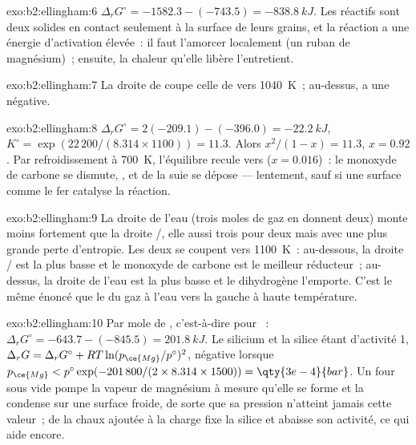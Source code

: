 \begin{solution}{exo:b2:ellingham:6}
$\Delta_r G^\circ = -1582.3 - (-743.5) = \qty{-838.8}{kJ}$. Les réactifs sont
deux solides en contact seulement à la surface de leurs grains, et la réaction
a une énergie d'activation élevée~: il faut l'amorcer localement (un ruban de magnésium)~;
ensuite, la chaleur qu'elle libère l'entretient.
\end{solution}

\begin{solution}{exo:b2:ellingham:7}
La droite de  coupe celle de  vers
\qty{1040}{K}~; au-dessus,  a une 
négative.
\end{solution}

\begin{solution}{exo:b2:ellingham:8}
$\Delta_r G^\circ = 2(-209.1) - (-396.0) = \qty{-22.2}{kJ}$, $K^\circ =
\exp(22\,200/(8.314 \times 1100)) = 11.3$. Alors $x^2/(1 - x) = 11.3$, $x =
0.92$. Par refroidissement à \qty{700}{K}, l'équilibre recule vers 
($x = 0.016$)~: le monoxyde de carbone se dismute, , et
de la suie se dépose --- lentement, sauf si une surface comme le fer catalyse la réaction.
\end{solution}

\begin{solution}{exo:b2:ellingham:9}
La droite de l'eau (trois moles de gaz en donnent deux) monte moins fortement que la
droite /, elle aussi trois pour deux mais avec une plus grande perte d'entropie. Les
deux se coupent vers \qty{1100}{K}~: au-dessous, la droite / est la plus basse et
le monoxyde de carbone est le meilleur réducteur~; au-dessus, la droite de l'eau est la plus basse et
le dihydrogène l'emporte. C'est le même énoncé que le 
du gaz à l'eau  vers la gauche à haute température.
\end{solution}

\begin{solution}{exo:b2:ellingham:10}
Par mole de , c'est-à-dire pour ~: $\Delta_r
G^\circ = -643.7 - (-845.5) = \qty{+201.8}{kJ}$. Le silicium et la silice étant
d'activité 1, $\Delta_r G = \Delta_r G^\circ + RT\ln(p_{\ce{Mg}}/p^\circ)^2$, négative
lorsque $p_{\ce{Mg}} < p^\circ\exp(-201\,800/(2 \times 8.314 \times 1500)) =
\qty{3e-4}{bar}$. Un four sous vide pompe la vapeur de magnésium à mesure
qu'elle se forme et la condense sur une surface froide, de sorte que sa pression n'atteint jamais
cette valeur~; de la chaux ajoutée à la charge fixe la silice et abaisse son activité,
ce qui aide encore.
\end{solution}

